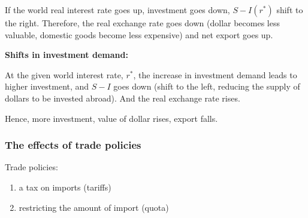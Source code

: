 \documentclass[12pt]{article}
\begin{document}
If the world real interest rate goes up, investment goes down, $ S - I(r^{*}) $ 
shift to the right. Therefore, the real exchange rate goes down (dollar becomes
less valuable, domestic goods become less expensive) and net export goes up.







{\textbf {Shifts in investment demand:}}

At the given world interest rate, $ r^{*} $, the increase in investment demand leads
to higher investment, and $ S - I $ goes down (shift to the left, reducing the 
supply of dollars to be invested abroad). And the real exchange rate rises.

Hence, more investment, value of dollar rises, export falls.

\begin{figure}[H]
\end{figure}



\subsubsection{The effects of trade policies}

Trade policies: 
\begin{enumerate}
\item a tax on imports (tariffs)
\item restricting the amount of import (quota)
\end{enumerate}
\end{document}
